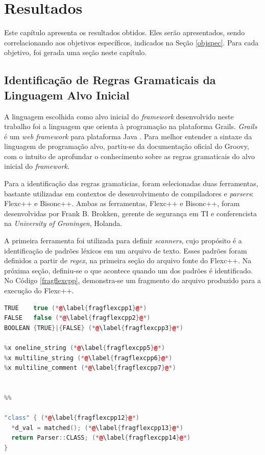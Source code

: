 \chapter[Resultados]{Resultados}
Este capítulo apresenta os resultados obtidos. Eles serão apresentados, sendo
correlacionando aos objetivos específicos, indicados na Seção \ref{objspec}.
Para cada objetivo, foi gerada uma seção neste capítulo.

\section{Identificação de Regras Gramaticais da Linguagem Alvo Inicial}
A linguagem escolhida como alvo inicial do \textit{framework} desenvolvido
neste trabalho foi a linguagem que orienta à programação na plataforma \textsf{Grails}. \textit{Grails} é um \textit{web framework} para plataforma Java
\cite{grails2015}. Para melhor entender a sintaxe da linguagem de programação
alvo, partiu-se da documentação oficial do \textsf{Groovy}, com o intuito de
aprofundar o conhecimento sobre as regras gramaticais do alvo inicial do
\textit{framework}.

Para a identificação das regras gramaticias, foram selecionadas duas ferramentas,
bastante utilizadas em contextos de desenvolvimento de compiladores e
\textit{parsers}: \textsf{Flexc++} e \textsf{Bisonc++}. Ambas as ferramentas, \textsf{Flexc++} e \textsf{Bisonc++}, foram desenvolvidas por Frank B. Brokken, gerente de segurança em TI e conferencista na \textit{University of Groningen}, Holanda.

A primeira ferramenta foi utilizada para definir \textit{scanners}, cujo propósito é a identificação de padrões léxicos em um arquivo de texto. Esses padrões foram definidos a partir de \textit{regex}, na primeira seção do arquivo fonte do Flexc++. Na próxima seção, definiu-se o que acontece quando um dos padrões é identificado. No Código \ref{fragflexcpp}, demonstra-se um fragmento do arquivo produzido para a execução do \textsf{Flexc++}.

\begin{lstlisting}[language=C++, label=fragflexcpp, caption=Fragmento do código fonte para o \flexcpp]
TRUE    true (*@\label{fragflexcpp1}@*)
FALSE   false (*@\label{fragflexcpp2}@*)
BOOLEAN {TRUE}|{FALSE} (*@\label{fragflexcpp3}@*)

%x oneline_string (*@\label{fragflexcpp5}@*)
%x multiline_string (*@\label{fragflexcpp6}@*)
%x multiline_comment (*@\label{fragflexcpp7}@*)


%%

"class" { (*@\label{fragflexcpp12}@*)
  *d_val = matched(); (*@\label{fragflexcpp13}@*)
  return Parser::CLASS; (*@\label{fragflexcpp14}@*)
}
\end{lstlisting}

